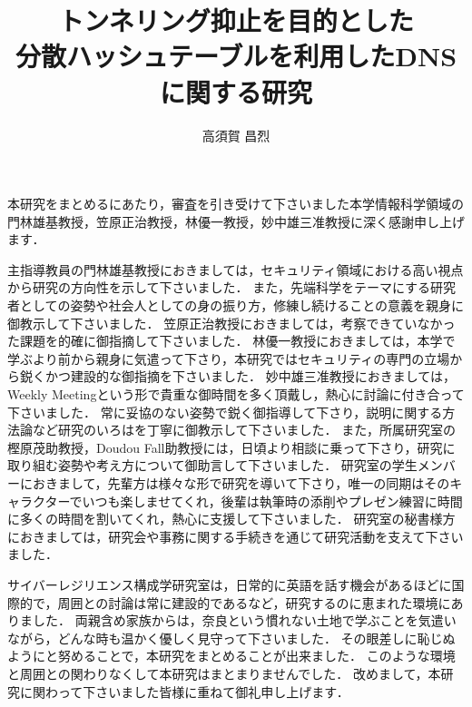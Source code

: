 \documentclass[12pt]{jarticle} %
\title{トンネリング抑止を目的とした\\分散ハッシュテーブルを利用したDNSに関する研究}
\author{高須賀 昌烈}
\begin{document}
\titlepage
\cmemberspage
\firstabstract
\secondabstract



\toc
\newpage
\listoffigures
\newpage
\listoftables
\newpage
\listofalgorithms



\newpage
{}











\newpage
\acknowledgements
本研究をまとめるにあたり，審査を引き受けて下さいました本学情報科学領域の門林雄基教授，笠原正治教授，林優一教授，妙中雄三准教授に深く感謝申し上げます．

主指導教員の門林雄基教授におきましては，セキュリティ領域における高い視点から研究の方向性を示して下さいました．
また，先端科学をテーマにする研究者としての姿勢や社会人としての身の振り方，修練し続けることの意義を親身に御教示して下さいました．
笠原正治教授におきましては，考察できていなかった課題を的確に御指摘して下さいました．
林優一教授におきましては，本学で学ぶより前から親身に気遣って下さり，本研究ではセキュリティの専門の立場から鋭くかつ建設的な御指摘を下さいました．
妙中雄三准教授におきましては，Weekly Meetingという形で貴重な御時間を多く頂戴し，熱心に討論に付き合って下さいました．
常に妥協のない姿勢で鋭く御指導して下さり，説明に関する方法論など研究のいろはを丁寧に御教示して下さいました．
また，所属研究室の樫原茂助教授，Doudou Fall助教授には，日頃より相談に乗って下さり，研究に取り組む姿勢や考え方について御助言して下さいました．
研究室の学生メンバーにおきまして，先輩方は様々な形で研究を導いて下さり，唯一の同期はそのキャラクターでいつも楽しませてくれ，後輩は執筆時の添削やプレゼン練習に時間に多くの時間を割いてくれ，熱心に支援して下さいました．
研究室の秘書様方におきましては，研究会や事務に関する手続きを通じて研究活動を支えて下さいました．

サイバーレジリエンス構成学研究室は，日常的に英語を話す機会があるほどに国際的で，周囲との討論は常に建設的であるなど，研究するのに恵まれた環境にありました．
両親含め家族からは，奈良という慣れない土地で学ぶことを気遣いながら，どんな時も温かく優しく見守って下さいました．
その眼差しに恥じぬようにと努めることで，本研究をまとめることが出来ました．
このような環境と周囲との関わりなくして本研究はまとまりませんでした．
改めまして，本研究に関わって下さいました皆様に重ねて御礼申し上げます．
\end{document}

